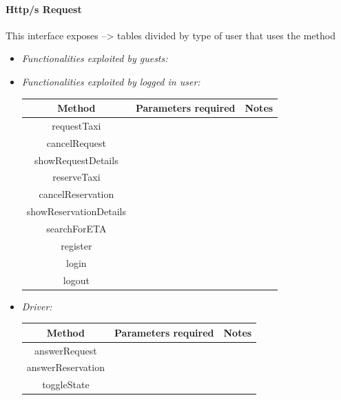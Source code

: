 \documentclass{article}
\begin{document}
\paragraph{Http/s Request}
This interface exposes  %
--> tables divided by type of user that uses the method %
\begin{itemize}
	\item \textit{Functionalities exploited by guests:}\\	
	
	\item \textit{Functionalities exploited by logged in user:}\\ %
		\begin{tabular}{*{3}{c}}
			\toprule
			Method & Parameters required & Notes \\
			\midrule
			requestTaxi &  & \\ %
			cancelRequest & & \\ %
			showRequestDetails & & \\
			reserveTaxi & &  \\
			cancelReservation & & \\
			showReservationDetails & & \\
			searchForETA & & \\
			register & & \\
			login & & \\
			logout & & \\
			\bottomrule
		\end{tabular}

	\item \textit{Driver:}

				\begin{tabular}{*{3}{c}}
					\toprule
					Method & Parameters required & Notes \\
					\midrule
					answerRequest & & \\ %
					answerReservation & & \\ %
					toggleState & & \\
					\bottomrule
				\end{tabular}

\end{itemize}
\end{document}
